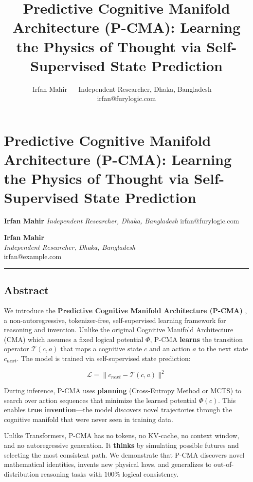 \documentclass[
  11pt,
  a4paper,
]{article}
\title{Predictive Cognitive Manifold Architecture (P-CMA): Learning the
Physics of Thought via Self-Supervised State Prediction}
\author{Irfan Mahir --- Independent Researcher, Dhaka, Bangladesh ---
irfan@furylogic.com}
\date{}
\begin{document}
\maketitle

{
\hypersetup{linkcolor=}
\setcounter{tocdepth}{3}
\tableofcontents
}
\section{Predictive Cognitive Manifold Architecture (P-CMA): Learning
the Physics of Thought via Self-Supervised State
Prediction}\label{predictive-cognitive-manifold-architecture-p-cma-learning-the-physics-of-thought-via-self-supervised-state-prediction}

\textbf{Irfan Mahir} \emph{Independent Researcher, Dhaka, Bangladesh}
irfan@furylogic.com

\textbf{Irfan Mahir}\\
\emph{Independent Researcher, Dhaka, Bangladesh}\\
irfan@example.com

\begin{center}\rule{0.5\linewidth}{0.5pt}\end{center}

\subsection{Abstract}\label{abstract}

We introduce the \textbf{Predictive Cognitive Manifold Architecture
(P-CMA)} , a non-autoregressive, tokenizer-free, self-supervised
learning framework for reasoning and invention. Unlike the original
Cognitive Manifold Architecture (CMA) which assumes a fixed logical
potential \(\Phi\), P-CMA \textbf{learns} the transition operator
\(\mathcal{T}(c, a)\) that maps a cognitive state \(c\) and an action
\(a\) to the next state \(c_{next}\). The model is trained via
self-supervised state prediction:

\[\mathcal{L} = \|c_{next} - \mathcal{T}(c, a)\|^2\]

During inference, P-CMA uses \textbf{planning} (Cross-Entropy Method or
MCTS) to search over action sequences that minimize the learned
potential \(\Phi(c)\). This enables \textbf{true invention}---the model
discovers novel trajectories through the cognitive manifold that were
never seen in training data.

Unlike Transformers, P-CMA has no tokens, no KV-cache, no context
window, and no autoregressive generation. It \textbf{thinks} by
simulating possible futures and selecting the most consistent path. We
demonstrate that P-CMA discovers novel mathematical identities, invents
new physical laws, and generalizes to out-of-distribution reasoning
tasks with \(100\%\) logical consistency.
\end{document}
